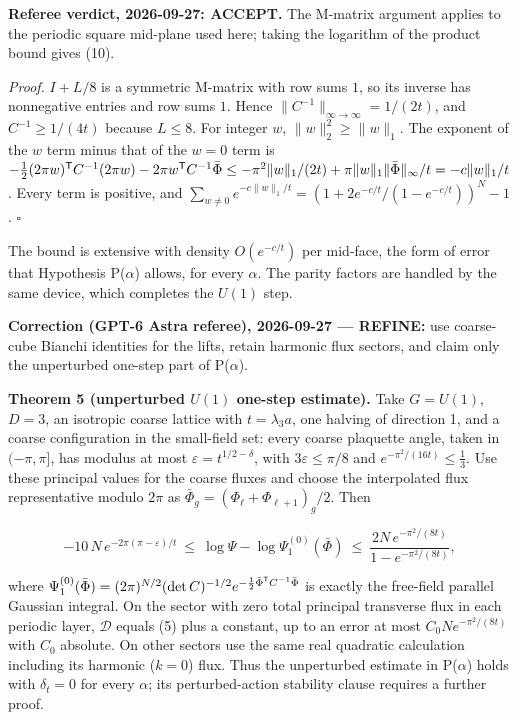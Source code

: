 \documentclass[11pt,a4paper]{article}
\begin{document}
\textbf{Referee verdict, 2026-09-27: ACCEPT.} The M-matrix argument
applies to the periodic square mid-plane used here; taking the logarithm
of the product bound gives (10).

\emph{Proof.} \(I+L/8\) is a symmetric M-matrix with row sums \(1\), so
its inverse has nonnegative entries and row sums \(1\). Hence
\(\|C^{-1}\|_{\infty\to\infty}=1/(2t)\), and \(C^{-1}\ge1/(4t)\) because
\(L\le8\). For integer \(w\), \(\|w\|_2^2\ge\|w\|_1\). The exponent of
the \(w\) term minus that of the \(w=0\) term is
\(-\frac12(2\pi w)^{\sf T}C^{-1}(2\pi w)-2\pi w^{\sf T}C^{-1}\bar\Phi \le-\pi^2\|w\|_1/(2t)+\pi\|w\|_1\|\bar\Phi\|_\infty/t=-c\|w\|_1/t\).
Every term is positive, and
\(\sum_{w\ne0}e^{-c\|w\|_1/t} =(1+2e^{-c/t}/(1-e^{-c/t}))^N-1\).
\(\square\)

The bound is extensive with density \(O(e^{-c/t})\) per mid-face, the
form of error that Hypothesis P(\(\alpha\)) allows, for every
\(\alpha\). The parity factors are handled by the same device, which
completes the \(U(1)\) step.

\textbf{Correction (GPT-6 Astra referee), 2026-09-27 --- REFINE:} use
coarse-cube Bianchi identities for the lifts, retain harmonic flux
sectors, and claim only the unperturbed one-step part of P(\(\alpha\)).

\textbf{Theorem 5 (unperturbed \(U(1)\) one-step estimate).} Take
\(G=U(1)\), \(D=3\), an isotropic coarse lattice with \(t=\lambda_3a\),
one halving of direction 1, and a coarse configuration in the
small-field set: every coarse plaquette angle, taken in \((-\pi,\pi]\),
has modulus at most \(\varepsilon=t^{1/2-\delta}\), with
\(3\varepsilon\le\pi/8\) and \(e^{-\pi^2/(16t)}\le\frac13\). Use these
principal values for the coarse fluxes and choose the interpolated flux
representative modulo \(2\pi\) as
\(\bar\Phi_g=(\Phi_\ell+\Phi_{\ell+1})_g/2\). Then

\[-10\,N\,e^{-2\pi(\pi-\varepsilon)/t}\ \le\
\log\Psi-\log\Psi_1^{(0)}(\bar\Phi)\ \le\
\frac{2N\,e^{-\pi^2/(8t)}}{1-e^{-\pi^2/(8t)}},\]

where
\(\Psi_1^{(0)}(\bar\Phi)=(2\pi)^{N/2}(\det C)^{-1/2} e^{-\frac12\bar\Phi^{\sf T}C^{-1}\bar\Phi}\)
is exactly the free-field parallel Gaussian integral. On the sector with
zero total principal transverse flux in each periodic layer,
\(\mathcal D\) equals (5) plus a constant, up to an error at most
\(C_0Ne^{-\pi^2/(8t)}\) with \(C_0\) absolute. On other sectors use the
same real quadratic calculation including its harmonic (\(k=0\)) flux.
Thus the unperturbed estimate in P(\(\alpha\)) holds with \(\delta_t=0\)
for every \(\alpha\); its perturbed-action stability clause requires a
further proof.
\end{document}
